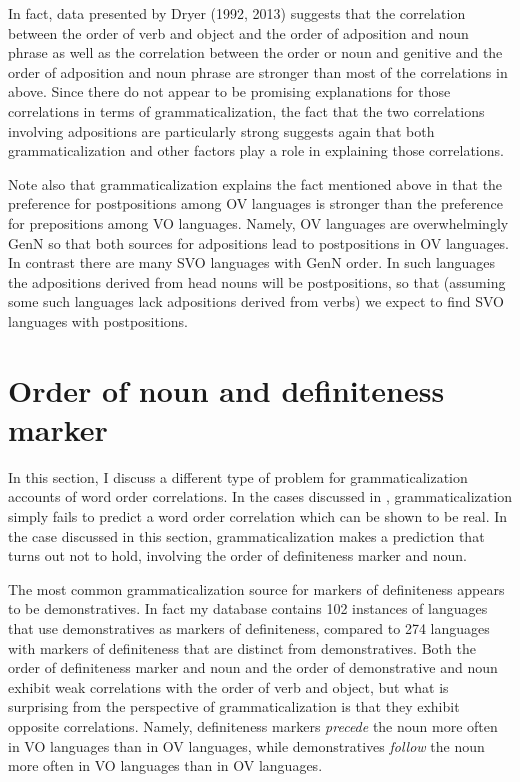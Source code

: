 \documentclass[output=paper]{langsci/langscibook}
\begin{document}
In fact, data presented by Dryer (1992, 2013) suggests that the correlation between the order of verb and object and the order of adposition and noun phrase as well as the correlation between the order or noun and genitive and the order of adposition and noun phrase are stronger than most of the correlations in  above. Since there do not appear to be promising explanations for those correlations in terms of grammaticalization, the fact that the two correlations involving adpositions are particularly strong suggests again that both grammaticalization and other factors play a role in explaining those correlations.

Note also that grammaticalization explains the fact mentioned above in  that the preference for postpositions among OV languages is stronger than the preference for prepositions among VO languages. Namely, OV languages are overwhelmingly GenN so that both sources for adpositions lead to postpositions in OV languages. In contrast there are many SVO languages with GenN order. In such languages the adpositions derived from head nouns will be postpositions, so that (assuming some such languages lack adpositions derived from verbs) we expect to find SVO languages with postpositions.

\section{Order of noun and definiteness marker}\label{sec:dryer:4}

In this section, I discuss a different type of problem for grammaticalization accounts of word order correlations. In the cases discussed in , grammaticalization simply fails to predict a word order correlation which can be shown to be real. In the case discussed in this section, grammaticalization makes a prediction that turns out not to hold, involving the order of definiteness marker and noun.

The most common grammaticalization source for markers of definiteness appears to be demonstratives. In fact my database contains 102 instances of languages that use demonstratives as markers of definiteness, compared to 274 languages with markers of definiteness that are distinct from demonstratives. Both the order of definiteness marker and noun and the order of demonstrative and noun exhibit weak correlations with the order of verb and object, but what is surprising from the perspective of grammaticalization is that they exhibit opposite correlations. Namely, definiteness markers \textit{precede} the noun more often in VO languages than in OV languages, while demonstratives \textit{follow} the noun more often in VO languages than in OV languages.
\end{document}
